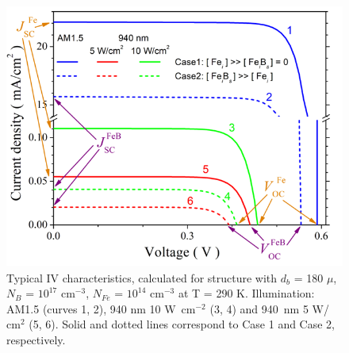 \documentclass[a4paper,fleqn]{cas-sc}
\begin{document}
\begin{figure}
	\centering
		\includegraphics[scale=.80]{Figure2.png}
	  \caption{Typical IV characteristics, calculated for structure with $d_b$ = 180 $\mu$, $N_B$ = $10^{17}$ $\mathrm{cm}^{-3}$, $N_{Fe}$ = $10^{14}$ $\mathrm{cm}^{-3}$ at T = 290 K. Illumination: AM1.5 (curves 1, 2), 940 nm 10 W~cm$^{-2}$ (3, 4) and 940~nm 5 W/$\mathrm{cm}^{2}$ (5, 6). Solid and dotted lines correspond to Case 1 and Case 2, respectively.}\label{fig2}
\end{figure}
%





\end{document}

